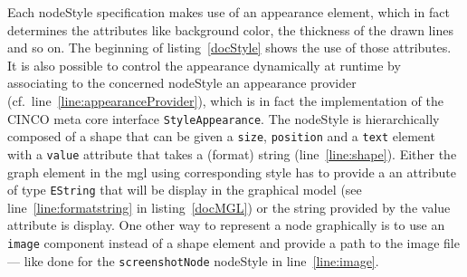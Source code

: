 Each nodeStyle specification makes use of an appearance element, which in fact determines the attributes like background color, the thickness of the drawn lines and so on. The beginning of listing~\ref{docStyle} shows the use of those attributes. It is also possible to control the appearance dynamically at runtime by associating to the concerned nodeStyle an appearance provider (cf.\ line~\ref{line:appearanceProvider}), which is in fact the implementation of the CINCO meta core interface \lstinline{StyleAppearance}. The nodeStyle is hierarchically composed of a shape that can be given a \lstinline[language=MGL]{size}, \lstinline[language=MGL]{position} and a \lstinline[language=MGL]{text} element with a \lstinline[language=MGL]{value} attribute that takes a (format) string (line~\ref{line:shape}). Either the graph element in the \acrshort{mgl} using corresponding style has to provide a an attribute of type \lstinline{EString} that will be display in the graphical model (see line~\ref{line:formatstring} in listing~\ref{docMGL}) or the string provided by the value attribute is display. One other way to represent a node graphically is to use an \lstinline[language=MGL]{image} component instead of a shape element and provide a path to the image file --- like done for the \lstinline{screenshotNode} nodeStyle in line~\ref{line:image}.

